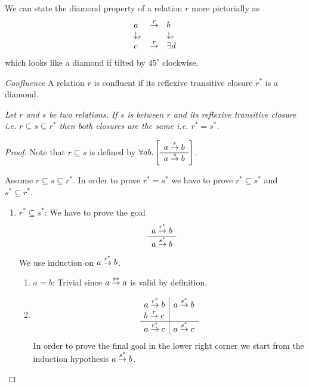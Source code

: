 We can state the diamond property of a relation $r$ more pictorially as
$$
\begin{array}{lll}
    a   &  \stackrel{r}{\to} &   b
    \\
    \downarrow_r & & \downarrow_r
    \\
    c & \stackrel{r}{\to} & \exists d
\end{array}
$$
which looks like a diamond if tilted by $45^\circ$ clockwise.


\begin{definition}
    \emph{Confluence} A relation $r$ is confluent if its reflexive transitive
    closure $r^*$ is a diamond.
\end{definition}


\begin{theorem}
    \label{RelationBetween}
    \emph{Let $r$ and $s$ be two relations. If $s$ is between $r$ and its
    reflexive transitive closure i.e. $r \subseteq s \subseteq r^*$ then both
    closures are the same i.e. $r^* = s^*$.}

    \begin{proof}
        Note that $r \subseteq s$ is defined by $\forall ab. \left[ \begin{array}{l} a \stackrel{r}{\to} b \\ \hline a
        \stackrel{s}{\to} b\end{array} \right]$.

        Assume $r \subseteq s \subseteq r^*$.
        In order to prove $r^* = s^*$ we have to prove $r^* \subseteq s^*$ and
        $s^* \subseteq r^*$.

        \begin{enumerate}
            \item $r^* \subseteq s^*$: We have to prove the goal
                $$
                \begin{array}{c} a \stackrel{r^*}{\to} b \\ \hline a \stackrel{s^*}{\to} b\end{array}
                $$
                We use induction on $a \stackrel{r^*}{\to} b$.
                \begin{enumerate}
                    \item $a = b$: Trivial since $a \stackrel{s*}{\to} a$ is valid by
                        definition.

                    \item
                        $$
                        \begin{array}{l|l}
                            a \stackrel{r^*}{\to} b
                            &
                            a \stackrel{s^*}{\to} b
                            \\
                            b \stackrel{r}{\to} c
                            \\
                            \hline
                            a \stackrel{r^*}{\to} c
                            &
                            a \stackrel{s^*}{\to} c
                        \end{array}
                        $$
                        In order to prove the final goal in the lower right
                        corner we start from the induction hypothesis $a
                        \stackrel{s^*}{\to} b$.


\end{enumerate}
\end{enumerate}
\end{proof}
\end{theorem}
